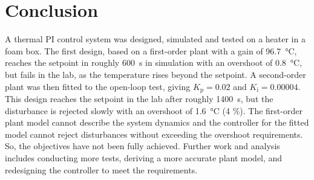 \documentclass[10pt, a4paper, twocolumn]{article}
\newcommand{\upsub}[1]{_{\mathrm{#1}}}
\renewcommand{\thesection}{\Roman{section}}
\begin{document}
\section{Conclusion}
A thermal PI control system was designed, simulated and tested on a heater in a foam box. The first design, based on a first-order plant with a gain of \qty{96.7}{\degreeCelsius}, reaches the setpoint in roughly \qty{600}{\second} in simulation with an overshoot of \qty{0.8}{\degreeCelsius}, but fails in the lab, as the temperature rises beyond the setpoint. A second-order plant was then fitted to the open-loop test, giving $K\upsub{p}=0.02$ and $K\upsub{i}=0.00004$. This design reaches the setpoint in the lab after roughly \qty{1400}{\second}, but the disturbance is rejected slowly with an overshoot of \qty{1.6}{\degreeCelsius} (4 \%). The first-order plant model cannot describe the system dynamics and the controller for the fitted model cannot reject disturbances without exceeding the overshoot requirements. So, the objectives have not been fully achieved. Further work and analysis includes conducting more tests, deriving a more accurate plant model, and redesigning the controller to meet the requirements.
	
	\appendix
	\renewcommand{\thesection}{\Alph{section}}
	\renewcommand{\theequation}{\thesection.\arabic{equation}}
	\renewcommand{\thetable}{\thesection.\arabic{table}}
	\renewcommand{\thefigure}{\thesection.\arabic{figure}}
\end{document}
